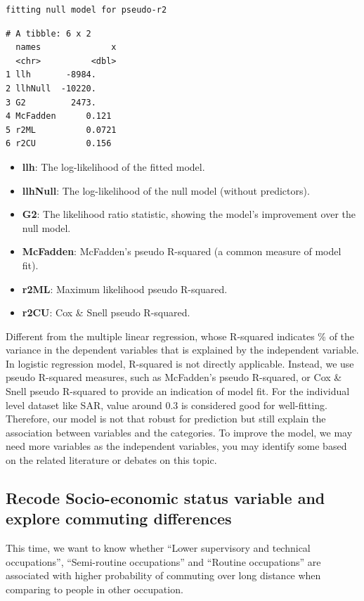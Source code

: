 \documentclass[
  letterpaper,
  DIV=11,
  numbers=noendperiod]{scrreprt}
\begin{document}
\begin{verbatim}
fitting null model for pseudo-r2
\end{verbatim}

\begin{verbatim}
# A tibble: 6 x 2
  names              x
  <chr>          <dbl>
1 llh       -8984.    
2 llhNull  -10220.    
3 G2         2473.    
4 McFadden      0.121 
5 r2ML          0.0721
6 r2CU          0.156 
\end{verbatim}

\begin{itemize}
\item
  \textbf{llh}: The log-likelihood of the fitted model.
\item
  \textbf{llhNull}: The log-likelihood of the null model (without
  predictors).
\item
  \textbf{G2}: The likelihood ratio statistic, showing the model's
  improvement over the null model.
\item
  \textbf{McFadden}: McFadden's pseudo R-squared (a common measure of
  model fit).
\item
  \textbf{r2ML}: Maximum likelihood pseudo R-squared.
\item
  \textbf{r2CU}: Cox \& Snell pseudo R-squared.
\end{itemize}

Different from the multiple linear regression, whose R-squared indicates
\% of the variance in the dependent variables that is explained by the
independent variable. In logistic regression model, R-squared is not
directly applicable. Instead, we use pseudo R-squared measures, such as
McFadden's pseudo R-squared, or Cox \& Snell pseudo R-squared to provide
an indication of model fit. For the individual level dataset like SAR,
value around 0.3 is considered good for well-fitting. Therefore, our
model is not that robust for prediction but still explain the
association between variables and the categories. To improve the model,
we may need more variables as the independent variables, you may
identify some based on the related literature or debates on this topic.

\subsection{Recode Socio-economic status variable and explore commuting
differences}\label{recode-socio-economic-status-variable-and-explore-commuting-differences}

This time, we want to know whether ``Lower supervisory and technical
occupations'', ``Semi-routine occupations'' and ``Routine occupations''
are associated with higher probability of commuting over long distance
when comparing to people in other occupation.
\end{document}
